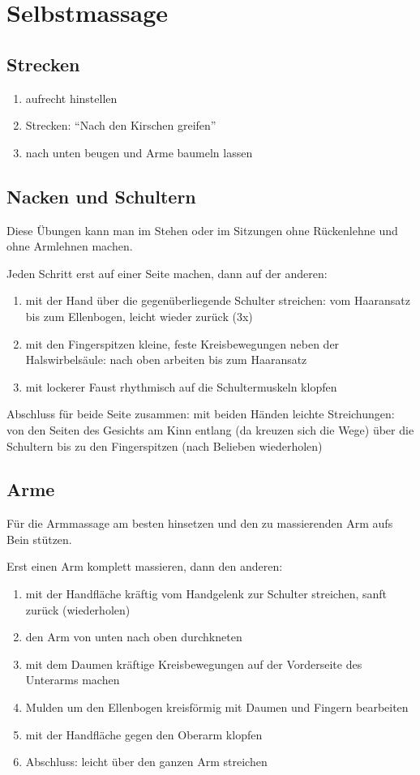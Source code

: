 \chapter{Selbstmassage}

\section{Strecken}
\begin{enumerate}
  \item aufrecht hinstellen
  \item Strecken: "`Nach den Kirschen greifen"'
  \item nach unten beugen und Arme baumeln lassen
\end{enumerate}

\section{Nacken und Schultern}
Diese Übungen kann man im Stehen oder im Sitzungen ohne Rückenlehne und ohne Armlehnen machen.

Jeden Schritt erst auf einer Seite machen, dann auf der anderen:
\begin{enumerate}
  \item mit der Hand über die gegenüberliegende Schulter streichen: vom Haaransatz bis zum Ellenbogen, leicht wieder zurück (3x)
  \item mit den Fingerspitzen kleine, feste Kreisbewegungen neben der Halswirbelsäule: nach oben arbeiten bis zum Haaransatz
  \item mit lockerer Faust rhythmisch auf die Schultermuskeln klopfen
\end{enumerate}

Abschluss für beide Seite zusammen: mit beiden Händen leichte Streichungen: von den Seiten des Gesichts am Kinn entlang (da kreuzen sich die Wege) über die Schultern bis zu den Fingerspitzen (nach Belieben wiederholen)

\section{Arme}
Für die Armmassage am besten hinsetzen und den zu massierenden Arm aufs Bein stützen.

Erst einen Arm komplett massieren, dann den anderen:
\begin{enumerate}
  \item mit der Handfläche kräftig vom Handgelenk zur Schulter streichen, sanft zurück (wiederholen)
  \item den Arm von unten nach oben durchkneten
  \item mit dem Daumen kräftige Kreisbewegungen auf der Vorderseite des Unterarms machen
  \item Mulden um den Ellenbogen kreisförmig mit Daumen und Fingern bearbeiten
  \item mit der Handfläche gegen den Oberarm klopfen
  \item Abschluss: leicht über den ganzen Arm streichen
\end{enumerate}

